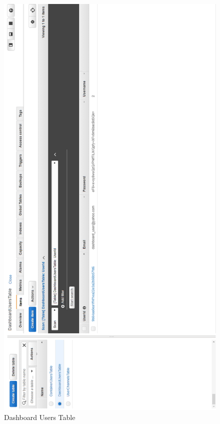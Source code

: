 \begin{figure}[p]
	\centering
	\noindent
	\includegraphics[width=0.5\paperwidth]{./images/aws_resources/DynamoDB.PNG}
	\caption{Dashboard Users Table}
	\label{fig:dynamodb}
\end{figure}

\newpage

